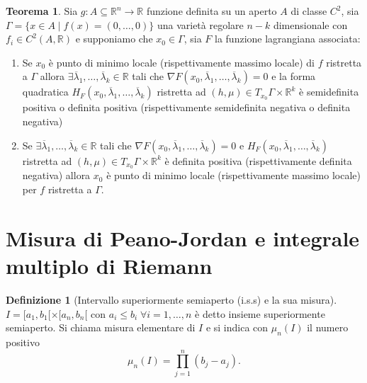 \documentclass[leqno]{article}
\theoremstyle{definition}
\newtheorem{definition}{Definizione}[section]
\numberwithin{equation}{section}
\newtheorem{theorem}{Teorema}[section]
\theoremstyle{remark}
\begin{document}
	\begin{theorem}
		Sia $g:A\subseteq \mathbb{R}^n \rightarrow \mathbb{R}$ funzione definita su un aperto $A$ di classe $C^2$, sia $\Gamma =\{ x \in A \; | \; f(x)=(0,\dots,0)\}$ una varietà regolare $n-k$ dimensionale con $f_i\in C^2(A,\mathbb{R})$ e supponiamo che $x_0\in \Gamma$, sia $F$ la funzione lagrangiana associata:
		\begin{enumerate}
			\item Se $x_0$ è punto di minimo locale (rispettivamente massimo locale) di $f$ ristretta a $\Gamma$ allora $\exists \overline{\lambda}_1,\dots,\overline{\lambda}_k \in \mathbb{R}$ tali che $\nabla F(x_0,\overline{\lambda}_1,\dots,\overline{\lambda}_k)=0$ e la forma quadratica $H_F(x_0,\overline{\lambda}_1,\dots,\overline{\lambda}_k)$ ristretta ad $(h,\mu)\in T_{x_0}\Gamma \times \mathbb{R}^k$ è semidefinita positiva o definita positiva (rispettivamente semidefinita negativa o definita negativa)
			\item Se $\exists \overline{\lambda}_1,\dots,\overline{\lambda}_k \in \mathbb{R}$ tali che $\nabla F (x_0,\overline{\lambda}_1,\dots,\overline{\lambda}_k)=0$ e $H_F(x_0,\overline{\lambda}_1,\dots,\overline{\lambda}_k)$ ristretta ad $(h,\mu)\in T_{x_0}\Gamma \times \mathbb{R}^k$ è definita positiva (rispettivamente definita negativa) allora $x_0$ è punto di minimo locale (rispettivamente massimo locale) per $f$ ristretta a $\Gamma$.
		\end{enumerate}
	\end{theorem}
	\section{Misura di Peano-Jordan e integrale multiplo di Riemann}
	\begin{definition}[Intervallo superiormente semiaperto (i.s.s) e la sua misura] 
		$I=[a_1,b_1[\times[a_n,b_n[$ con $a_i\le b_i \; \forall i=1,\dots,n$ è detto insieme superiormente semiaperto. Si chiama misura elementare di $I$ e si indica con $\mu_n(I)$ il numero positivo 
		\[\mu_n(I)=\prod_{j=1}^n(b_j-a_j).\]
		
	\end{definition}
	
\end{document}
